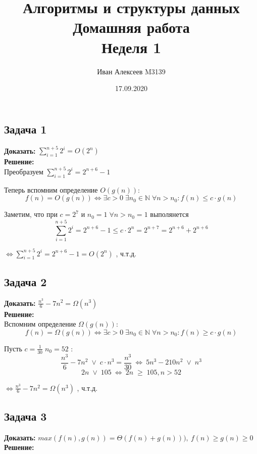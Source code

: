 \documentclass{article}
\title{Алгоритмы и структуры данных\\Домашняя работа\\Неделя 1}
\date{17.09.2020}
\author{Иван Алексеев M3139}
\begin{document}
	\maketitle %
	\subsection*{Задача 1}
	
	\textbf{Доказать:} $\sum\limits_{i=1}^{n+5} 2^i = O(2^n)$ \\
	\textbf{Решение:} \\
	
	Преобразуем $\sum\limits_{i=1}^{n+5} 2^i = 2^{n+6} - 1$
	
	Теперь вспомним определение $O(g(n))$:
	$$ f(n) = O(g(n)) \Leftrightarrow \exists c > 0 \; \exists n_0 \in \mathds{N} \; \forall n > n_0 : f(n) \leq c\cdot g(n)$$
	
	Заметим, что при $c = 2^7$ и $n_0 = 1 \; \forall n > n_0 = 1$ выполянется $$\sum\limits_{i=1}^{n+5} 2^i = 2^{n+6} - 1 \leq c \cdot 2^n = 2^{n+7} = 2^{n + 6} + 2^{n + 6}$$

	$\Leftrightarrow\sum\limits_{i=1}^{n+5} 2^i = 2^{n+6} - 1 = O(2^n)$ , ч.т.д.
	
	
	
	\subsection*{Задача 2}
	\textbf{Доказать:} $\frac{n^3}{6} - 7n^{2} = \Omega(n^3)$ \\
	\textbf{Решение:} \\
	
	Вспомним определение $\Omega(g(n))$:
	$$ f(n) = \Omega(g(n)) \Leftrightarrow \exists c > 0 \; \exists n_0 \in \mathds{N} \; \forall n > n_0 : f(n) \geq c\cdot g(n)$$
	
	Пусть $c = \frac{1}{30} \; n_0 = 52$ :
	$$\frac{n^3}{6} - 7n^{2} \; \vee \; c \cdot n^3 = \frac{n^3}{30} \ \Leftrightarrow  \ 5n^3 - 210n^2 \; \vee \; n^3$$
	$$ 2n  \; \vee \; 105 \ \Leftrightarrow  \  2n  \; \geq \; 105, n > 52$$
	
	$\Leftrightarrow\frac{n^3}{6} - 7n^{2} = \Omega(n^3)$ , ч.т.д.
	
	
	
	
	\subsection*{Задача 3}
	\textbf{Доказать:} $max(f(n), g(n)) = \Theta(f(n) + g(n))), \ f(n) \geq g(n) \geq 0$ \\
	\textbf{Решение:} \\
	
\end{document}
